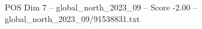 \begin{textsample}{POS Dim 7 – global\_north\_2023\_09 – Score -2.00 – global\_north\_2023\_09/91538831.txt}
\end{textsample}

